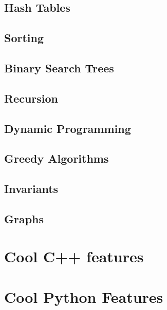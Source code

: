 \documentclass[runningheads]{llncs}
\begin{document}
\subsection{Hash Tables}
\subsection{Sorting}
\subsection{Binary Search Trees}
\subsection{Recursion}
\subsection{Dynamic Programming}
\subsection{Greedy Algorithms}
\subsection{Invariants}
\subsection{Graphs}

\section{Cool C++ features}

\section{Cool Python Features}

%
%
 
 
\end{document}
